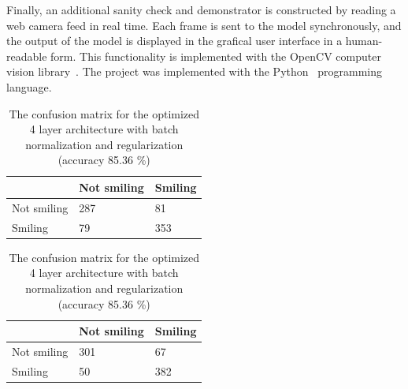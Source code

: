 \documentclass{article}
\begin{document}
Finally, an additional sanity check and demonstrator is constructed by
reading a web camera feed in real time. Each frame is sent to the
model synchronously, and the output of the model is displayed in the
grafical user interface in a human-readable form. This functionality
is implemented with the OpenCV computer vision library~\cite{opencv}.
The project was implemented with the Python~\cite{rossum_1995}
programming language.

\begin{table}[t]
  \begin{minipage}[t]{0.5\textwidth}\centering
    \centering
    \caption{The confusion matrix for the optimized default architecture
      with batch normalization (accuracy 80.00 \%)}\label{tab:default-confusion}
    \begin{tabular}{lll}
      \hline
      & Not smiling & Smiling \\ \hline
      \multicolumn{1}{l|}{Not smiling} & 287         & 81      \\
      \multicolumn{1}{l|}{Smiling}     & 79          & 353     \\ \hline
    \end{tabular}
  \end{minipage}
  \begin{minipage}[t]{0.5\textwidth}\centering
    \centering
    \caption{The confusion matrix for the optimized 4 layer architecture
      with batch normalization and regularization (accuracy 85.36
      \%)}\label{tab:best-confusion}
    \begin{tabular}{lll}
      \hline
      & Not smiling & Smiling \\ \hline
      \multicolumn{1}{l|}{Not smiling} & 301         & 67     \\
      \multicolumn{1}{l|}{Smiling}     & 50          & 382     \\ \hline
    \end{tabular}
  \end{minipage}
\end{table}
\end{document}
